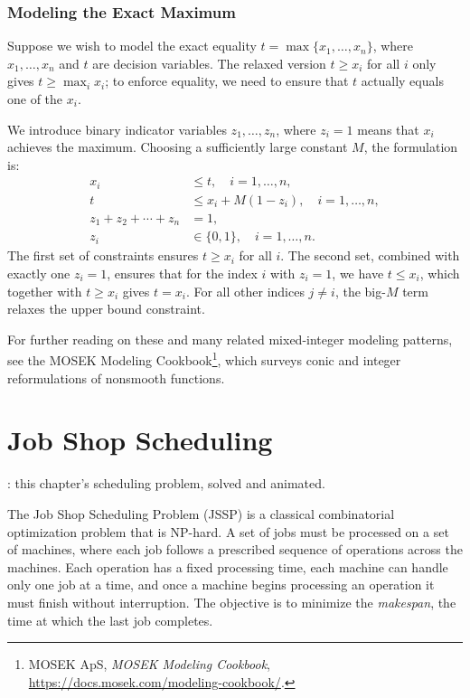 \subsubsection{Modeling the Exact Maximum}

Suppose we wish to model the exact equality $t = \max\{x_1, \ldots, x_n\}$, where $x_1, \ldots, x_n$ and $t$ are decision variables.  The relaxed version $t \geq x_i$ for all $i$ only gives $t \geq \max_i x_i$; to enforce equality, we need to ensure that $t$ actually equals one of the $x_i$.

We introduce binary indicator variables $z_1, \ldots, z_n$, where $z_i = 1$ means that $x_i$ achieves the maximum.  Choosing a sufficiently large constant $M$, the formulation is:
\[
\begin{aligned}
x_i &\leq t, \quad i = 1, \ldots, n, \\
t &\leq x_i + M(1 - z_i), \quad i = 1, \ldots, n, \\
z_1 + z_2 + \cdots + z_n &= 1, \\
z_i &\in \{0,1\}, \quad i = 1, \ldots, n.
\end{aligned}
\]
The first set of constraints ensures $t \geq x_i$ for all $i$.  The second set, combined with exactly one $z_i = 1$, ensures that for the index $i$ with $z_i = 1$, we have $t \leq x_i$, which together with $t \geq x_i$ gives $t = x_i$.  For all other indices $j \neq i$, the big-$M$ term relaxes the upper bound constraint.

For further reading on these and many related mixed-integer modeling patterns, see the MOSEK Modeling Cookbook\footnote{MOSEK ApS, \emph{MOSEK Modeling Cookbook}, \url{https://docs.mosek.com/modeling-cookbook/}.}, which surveys conic and integer reformulations of nonsmooth functions.

\newpage

\section{Job Shop Scheduling}
\label{sec:job-shop}

\begin{tryit}
: this chapter's scheduling problem, solved and animated.
\end{tryit}


The Job Shop Scheduling Problem (JSSP) is a classical combinatorial optimization problem that is NP-hard.
A set of jobs must be processed on a set of machines, where each job follows a prescribed sequence of operations across the machines.
Each operation has a fixed processing time, each machine can handle only one job at a time, and once a machine begins processing an operation it must finish without interruption.
The objective is to minimize the \emph{makespan}, the time at which the last job completes.

